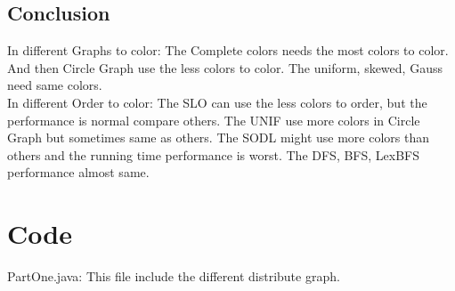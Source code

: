 \documentclass{article}
\begin{document}
\subsection{Conclusion}
    In different Graphs to color: The Complete colors needs the most colors to color. And then Circle Graph use the less colors to color. The uniform, skewed, Gauss need same colors.\\
    In different Order to color: The SLO can use the less colors to order, but the performance is normal compare others. The UNIF use more colors in Circle Graph but sometimes same as others. The SODL might use more colors than others and the running time performance is worst. The DFS, BFS, LexBFS performance almost same.

\section{Code}
PartOne.java: This file include the different distribute graph.\cite{jfree}
\end{document}
